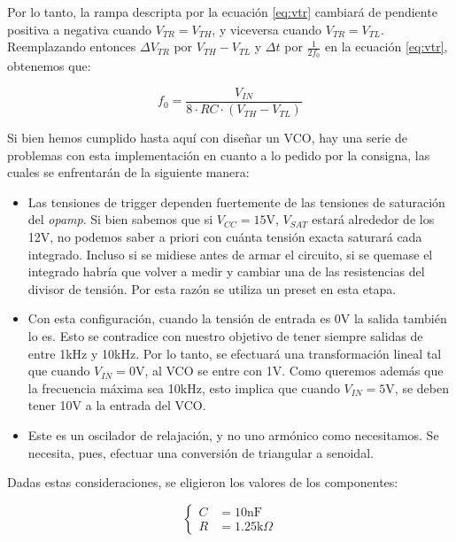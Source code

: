 \documentclass[../../tc_tp6_main.tex]{subfiles}
\begin{document}
Por lo tanto, la rampa descripta por la ecuaci\'on \ref{eq:vtr} cambiar\'a de pendiente positiva a negativa cuando $V_{TR} = V_{TH}$, y viceversa cuando $V_{TR} = V_{TL}$. Reemplazando entonces $\Delta V_{TR}$ por $V_{TH} - V_{TL}$ y $\Delta t$ por $\frac{1}{2f_0}$ en la ecuaci\'on \ref{eq:vtr}, obtenemos que:

\begin{equation}
	f_0 = \frac{V_{IN}}{8\cdot RC\cdot (V_{TH} - V_{TL})}
	\label{eq:frecuencia}
\end{equation}

Si bien hemos cumplido hasta aqu\'i con dise\~nar un VCO, hay una serie de problemas con esta implementaci\'on en cuanto a lo pedido por la consigna, las cuales se enfrentar\'an de la siguiente manera:

\begin{itemize}
	\item Las tensiones de trigger dependen fuertemente de las tensiones de saturaci\'on del \textit{opamp}. Si bien sabemos que si $V_{CC} = 15\mathrm{V}$, $V_{SAT}$ estar\'a alrededor de los 12V, no podemos saber a priori con cu\'anta tensi\'on exacta saturar\'a cada integrado. Incluso si se midiese antes de armar el circuito, si se quemase el integrado habr\'ia que volver a medir y cambiar una de las resistencias del divisor de tensi\'on. Por esta raz\'on se utiliza un preset en esta etapa.
	\item Con esta configuraci\'on, cuando la tensi\'on de entrada es 0V la salida tambi\'en lo es. Esto se contradice con nuestro objetivo de tener siempre salidas de entre 1kHz y 10kHz. Por lo tanto, se efectuar\'a una transformaci\'on lineal tal que cuando $V_{IN} = 0\mathrm{V}$, al VCO se entre con 1V. Como queremos adem\'as que la frecuencia m\'axima sea 10kHz, esto implica que cuando $V_{IN}=5\mathrm{V}$, se deben tener 10V a la entrada del VCO.
	\item Este es un oscilador de relajaci\'on, y no uno arm\'onico como necesitamos. Se necesita, pues, efectuar una conversi\'on de triangular a senoidal. 
\end{itemize}

Dadas estas consideraciones, se eligieron los valores de los componentes:

\begin{equation}
	\left\{
	\begin{aligned}
		C &= 10\mathrm{nF} \\
		R &= 1.25\mathrm{k}\Omega
	\end{aligned}
	\right.
\end{equation}
\end{document}
